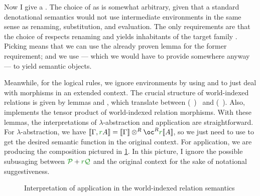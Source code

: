 Now I give a .
The choice of \AgdaBound{$\V$} as
\AgdaRecord{\AgdaUnderscore{}$\sqni$\AgdaUnderscore{}} is somewhat arbitrary,
given that a standard denotational semantics would not use intermediate
environments in the same sense as renaming, substitution, and evaluation.
The only requirements are that the choice of \AgdaBound{$\V$} respects renaming
and yields inhabitants of the target family
\AgdaFunction{$\llbracket$\_$\vdash$\_$\rrbracket$}.
Picking \AgdaRecord{\_$\sqni$\_} means that we can use the already proven lemma
 for the former requirement; and we use
 --- which we would have to provide somewhere anyway
--- to yield semantic objects.

Meanwhile, for the logical rules, we ignore environments by using
 and  to just deal with morphisms in
an extended context.
The crucial structure of world-indexed relations is given by lemmas
 and , which translate between
\mbox{\AgdaSpace{}\AgdaSymbol(\AgdaSpace{}%
\AgdaSpace{}\AgdaSymbol)%
\AgdaSpace{}} and
\mbox{\AgdaSpace{}\AgdaSpace{}\AgdaSymbol(%
\AgdaSpace{}\AgdaSpace{}%
\AgdaSymbol)}.
Also,  implements the tensor
product of world-indexed relation morphisms.
With these lemmas, the interpretations of $\lambda$-abstraction and application
are straightforward.
For $\lambda$-abstraction, we have
\mbox{$\sem{\Gamma, \gr rA} = \sem\Gamma \otimes^R \oc^R\gr r\sem{A}$},
so we just need to use  to get the desired semantic
function in the original context.
For application, we are producing the composition pictured in
\cref{fig:Wrel-app}.
In this picture, I ignore the possible subusaging between $\grP + \gr r\grQ$ and
the original context for the sake of notational suggestiveness.


\begin{figure}
  \centering
  \caption{Interpretation of application in the world-indexed relation
    semantics}
  \label{fig:Wrel-app}
\end{figure}

